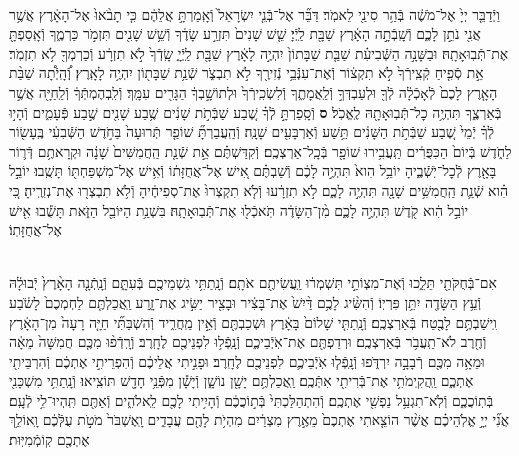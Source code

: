 \documentclass[twoside, openany, parskip=half, 11pt]{book}
\begin{document}
\begin{footnotesize}
\begin{multicols}{2}
\\
וַיְֿדַבֵּ֤ר יְיָ֙ אֶל־מֹשֶׁ֔ה בְּֿהַ֥ר סִינַ֖י לֵאמֹֽר׃ דַּבֵּ֞ר אֶל־בְּֿנֵ֤י יִשְׂרָאֵל֙ וְֿאָֽמַרְתָּ֣ אֲלֵהֶ֔ם כִּ֤י תָבֹ֨אוּ֙ אֶל־הָאָ֔רֶץ אֲשֶׁ֥ר אֲנִ֖י נֹתֵ֣ן לָכֶ֑ם וְֿשָֽׁבְֿתָ֣ה הָאָ֔רֶץ שַׁבָּ֖ת לַֽיְֿיָ׃ שֵׁ֤שׁ שָׁנִים֙ תִּזְרַ֣ע שָׂדֶ֔ךָ וְֿשֵׁ֥שׁ שָׁנִ֖ים תִּזְמֹ֣ר כַּרְמֶ֑ךָ וְֿאָֽסַפְתָּ֖ אֶת־תְּֿבֽוּאָתָֽהּ׃  וּבַשָּׁנָ֣ה הַשְּֿׁבִיעִ֗ת שַׁבַּ֤ת שַׁבָּתוֹן֙ יִהְיֶ֣ה לָאָ֔רֶץ שַׁבָּ֖ת לַֽיְֿיָ֑ שָֽׂדְֿךָ֙ לֹ֣א תִזְרָ֔ע וְֿכַרְמְךָ֖ לֹ֥א תִזְמֹֽר׃ אֵ֣ת סְֿפִ֤יחַ קְֿצִֽירְֿךָ֙ לֹ֣א תִקְצ֔וֹר וְֿאֶת־עִנְּֿבֵ֥י נְֿזִירֶ֖ךָ לֹ֣א תִבְצֹ֑ר שְֿׁנַ֥ת שַׁבָּת֖וֹן יִהְיֶ֥ה לָאָֽרֶץ׃ וְֽֿ֠הָֽיְֿתָ֠ה שַׁבַּ֨ת הָאָ֤רֶץ לָכֶם֙ לְֿאָכְֿלָ֔ה לְֿךָ֖ וּלְעַבְדְּךָ֣ וְֿלַֽאֲמָתֶ֑ךָ וְֿלִשְׂכִֽירְֿךָ֙ וּלְתוֹשָׁ֣בְךָ֔ הַגָּרִ֖ים עִמָּֽךְ׃ וְֿלִֽבְהֶמְתְּֿךָ֔ וְֿלַֽחַיָּ֖ה אֲשֶׁ֣ר בְּֿאַרְצֶ֑ךָ תִּהְיֶ֥ה כׇל־תְּֿבֽוּאָתָ֖הּ לֶֽאֱכֹֽל׃ \textbf{ס}  וְֿסָֽפַרְתָּ֣ לְֿךָ֗ שֶׁ֚בַע שַׁבְּֿתֹ֣ת שָׁנִ֔ים שֶׁ֥בַע שָׁנִ֖ים שֶׁ֣בַע פְּֿעָמִ֑ים וְֿהָי֣וּ לְֿךָ֗ יְֿמֵי֙ שֶׁ֚בַע שַׁבְּֿתֹ֣ת הַשָּׁנִ֔ים תֵּ֥שַׁע וְֿאַרְבָּעִ֖ים שָׁנָֽה׃ וְֿהַֽעֲבַרְתָּ֞ שׁוֹפַ֤ר תְּֿרוּעָה֙ בַּחֹ֣דֶשׁ הַשְּֿׁבִעִ֔י בֶּֽעָשׂ֖וֹר לַחֹ֑דֶשׁ בְּֿיוֹם֙ הַכִּפֻּרִ֔ים תַּֽעֲבִ֥ירוּ שׁוֹפָ֖ר בְּֿכָֽל־אַרְצְכֶֽם׃ וְֿקִדַּשְׁתֶּ֗ם אֵ֣ת שְֿׁנַ֤ת הַֽחֲמִשִּׁים֙ שָׁנָ֔ה וּקְרָאתֶ֥ם דְּֿר֛וֹר בָּאָ֖רֶץ לְֿכׇל־יֹֽשְֿׁבֶ֑יהָ יוֹבֵ֥ל הִוא֙ תִּהְיֶ֣ה לָכֶ֔ם וְֿשַׁבְתֶּ֗ם אִ֚ישׁ אֶל־אֲחֻזָּת֔וֹ וְֿאִ֥ישׁ אֶל־מִשְׁפַּחְתּ֖וֹ תָּשֻֽׁבוּ׃ יוֹבֵ֣ל הִ֗וא שְֿׁנַ֛ת הַֽחֲמִשִּׁ֥ים שָׁנָ֖ה תִּהְיֶ֣ה לָכֶ֑ם לֹ֣א תִזְרָ֔עוּ וְֿלֹ֤א תִקְצְרוּ֙ אֶת־סְפִיחֶ֔יהָ וְֿלֹ֥א תִבְצְר֖וּ אֶת־נְזִרֶֽיהָ׃ כִּ֚י יוֹבֵ֣ל הִ֔וא קֹ֖דֶשׁ תִּהְיֶ֣ה לָכֶ֑ם מִ֨ן־הַשָּׂדֶ֔ה תֹּֽאכְֿל֖וּ אֶת־תְּֿבֽוּאָתָֽהּ׃ בִּשְׁנַ֥ת הַיּוֹבֵ֖ל הַזֹּ֑את תָּשֻׁ֕בוּ אִ֖ישׁ אֶל־אֲחֻזָּתֽוֹ׃


\\
אִם־בְּֿחֻקֹּתַ֖י תֵּלֵ֑כוּ וְֿאֶת־מִצְוֹתַ֣י תִּשְׁמְר֔וּ וַֽעֲשִׂיתֶ֖ם אֹתָֽם׃ וְֿנָֽתַתִּ֥י גִשְׁמֵיכֶ֖ם בְּֿעִתָּ֑ם וְֿנָֽתְֿנָ֤ה הָאָ֨רֶץ֙ יְֿבוּלָ֔הּ וְֿעֵ֥ץ הַשָּׂדֶ֖ה יִתֵּ֥ן פִּרְיֽוֹ׃ וְֿהִשִּׂ֨יג לָכֶ֥ם דַּ֨יִשׁ֙ אֶת־בָּצִ֔יר וּבָצִ֖יר יַשִּׂ֣יג אֶת־זָ֑רַע וַֽאֲכַלְתֶּ֤ם לַחְמְכֶם֙ לָשֹׂ֔בַע וִֽישַׁבְתֶּ֥ם לָבֶ֖טַח בְּֿאַרְצְכֶֽם׃  וְֿנָֽתַתִּ֤י שָׁלוֹם֙ בָּאָ֔רֶץ וּשְׁכַבְתֶּ֖ם וְֿאֵ֣ין מַֽחֲרִ֑יד וְֿהִשְׁבַּתִּ֞י חַיָּ֤ה רָעָה֙ מִן־הָאָ֔רֶץ וְֿחֶ֖רֶב לֹא־תַֽעֲבֹ֥ר בְּֿאַרְצְכֶֽם׃ וּרְדַפְתֶּ֖ם אֶת־אֹֽיְֿבֵיכֶ֑ם וְֿנָֽפְֿל֥וּ לִפְנֵיכֶ֖ם לֶחָֽרֶב׃ וְֿרָֽדְֿפ֨וּ מִכֶּ֤ם חֲמִשָּׁה֙ מֵאָ֔ה וּמֵאָ֥ה מִכֶּ֖ם רְֿבָבָ֣ה יִרְדֹּ֑פוּ וְֿנָֽפְֿל֧וּ אֹֽיְֿבֵיכֶ֛ם לִפְנֵיכֶ֖ם לֶחָֽרֶב׃ וּפָנִ֣יתִי אֲלֵיכֶ֔ם וְֿהִפְרֵיתִ֣י אֶתְכֶ֔ם וְֿהִרְבֵּיתִ֖י אֶתְכֶ֑ם וַֽהֲקִֽימֹתִ֥י אֶת־בְּֿרִיתִ֖י אִתְּֿכֶֽם׃  וַֽאֲכַלְתֶּ֥ם יָשָׁ֖ן נוֹשָׁ֑ן וְֿיָשָׁ֕ן מִפְּֿנֵ֥י חָדָ֖שׁ תּוֹצִֽיאוּ׃ וְֿנָֽתַתִּ֥י מִשְׁכָּנִ֖י בְּֿתֽוֹכֲכֶ֑ם וְֿלֹֽא־תִגְעַ֥ל נַפְשִׁ֖י אֶתְכֶֽם׃ וְֿהִתְהַלַּכְתִּי֙ בְּֿת֣וֹכֲכֶ֔ם וְֿהָיִ֥יתִי לָכֶ֖ם לֵֽאלֹהִ֑ים וְֿאַתֶּ֖ם תִּֽהְיוּ־לִ֥י לְֿעָֽם׃ אֲנִ֞י יְיָ֣ אֱלֹֽהֵיכֶ֗ם אֲשֶׁ֨ר הוֹצֵ֤אתִי אֶתְכֶם֙ מֵאֶ֣רֶץ מִצְרַ֔יִם מִהְיֹ֥ת לָהֶ֖ם עֲבָדִ֑ים וָֽאֶשְׁבֹּר֙ מֹטֹ֣ת עֻלְּֿכֶ֔ם וָֽאוֹלֵ֥ךְ אֶתְכֶ֖ם קֽוֹמְֿמִיּֽוּת׃


\end{multicols}
\end{footnotesize}
\end{document}
